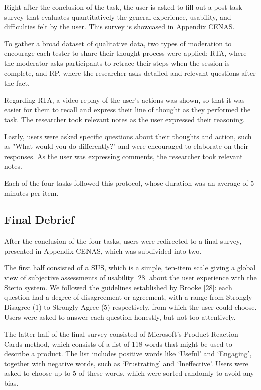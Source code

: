 Right after the conclusion of the task, the user is asked to fill out a post-task survey that evaluates quantitatively the general experience, usability, and difficulties felt by the user. This survey is showcased in Appendix CENAS.

To gather a broad dataset of qualitative data, two types of moderation to encourage each tester to share their thought process were applied: \ac{RTA}, where the moderator asks participants to retrace their steps when the session is complete, and \ac{RP}, where the researcher asks detailed and relevant questions after the fact.

Regarding \ac{RTA}, a video replay of the user's actions was shown, so that it was easier for them to recall and express their line of thought as they performed the task. The researcher took relevant notes as the user expressed their reasoning.

Lastly, users were asked specific questions about their thoughts and action, such as "What would you do differently?" and were encouraged to elaborate on their responses. As the user was expressing comments, the researcher took relevant notes.

Each of the four tasks followed this protocol, whose duration was an average of 5 minutes per item. 

\subsection{Final Debrief}

After the conclusion of the four tasks, users were redirected to a final survey, presented in Appendix CENAS, which was subdivided into two. 

The first half consisted of a \ac{SUS}, which is a simple, ten-item scale giving a global view of subjective assessments of usability [28] about the user experience with the Sterio system. We followed the guidelines established by Brooke [28]: each question had a degree of disagreement or agreement, with a range from Strongly Disagree (1) to Strongly Agree (5) respectively, from which the user could choose. Users were asked to answer each question honestly, but not too attentively.

The latter half of the final survey consisted of Microsoft's Product Reaction Cards method, which consists of a list of 118 words that might be used to describe a product. The list includes positive words like ‘Useful’ and ‘Engaging’, together with negative words, such as ‘Frustrating’ and ‘Ineffective’. Users were asked to choose up to 5 of these words, which were sorted randomly to avoid any bias.

